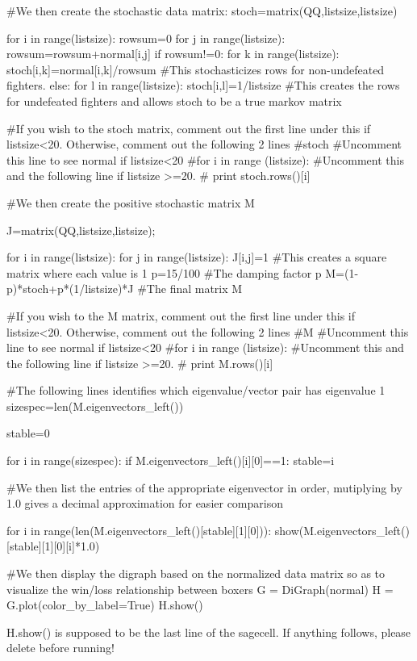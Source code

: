 \documentclass{ximera}
\begin{document}
\begin{sageCell}
            
#We then create the stochastic data matrix:
stoch=matrix(QQ,listsize,listsize)
    
for i in range(listsize):
    rowsum=0
    for j in range(listsize):
        rowsum=rowsum+normal[i,j]
    if rowsum!=0:
        for k in range(listsize):
            stoch[i,k]=normal[i,k]/rowsum #This stochasticizes rows for non-undefeated fighters.
    else:
        for l in range(listsize):
            stoch[i,l]=1/listsize #This creates the rows for undefeated fighters and allows stoch to be a true markov matrix

#If you wish to the stoch matrix, comment out the first line under this if listsize<20.  Otherwise, comment out the following 2 lines
#stoch #Uncomment this line to see normal if listsize<20
#for i in range (listsize): #Uncomment this and the following line if listsize >=20.
#    print stoch.rows()[i]

#We then create the positive stochastic matrix M

J=matrix(QQ,listsize,listsize);

for i in range(listsize):
    for j in range(listsize):
        J[i,j]=1 #This creates a square matrix where each value is 1
p=15/100 #The damping factor p
M=(1-p)*stoch+p*(1/listsize)*J #The final matrix M

#If you wish to the M matrix, comment out the first line under this if listsize<20.  Otherwise, comment out the following 2 lines
#M #Uncomment this line to see normal if listsize<20
#for i in range (listsize): #Uncomment this and the following line if listsize >=20.
#    print M.rows()[i]


#The following lines identifies which eigenvalue/vector pair has eigenvalue 1
sizespec=len(M.eigenvectors_left())

stable=0

for i in range(sizespec):
    if M.eigenvectors_left()[i][0]==1:
        stable=i

        
#We then list the entries of the appropriate eigenvector in order, mutiplying by 1.0 gives a decimal approximation for easier comparison
        
for i in range(len(M.eigenvectors_left()[stable][1][0])):
    show(M.eigenvectors_left()[stable][1][0][i]*1.0)
    

#We then display the digraph based on the normalized data matrix so as to visualize the win/loss relationship between boxers    
G = DiGraph(normal)
H = G.plot(color_by_label=True)
H.show()\end{sageCell}

H.show() is supposed to be the last line of the sagecell.  If anything follows, please delete before running!
\end{document}
